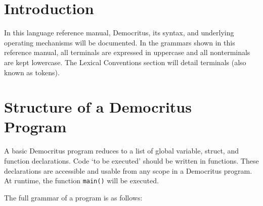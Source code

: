 \section{Introduction}
    In this language reference manual, Democritus, its syntax, and underlying operating mechanisms will be documented. In the grammars shown in this reference manual, all terminals are expressed in uppercase and all nonterminals are kept lowercase. The Lexical Conventions section will detail terminals (also known as tokens). 

\section{Structure of a Democritus Program}
    A basic Democritus program reduces to a list of global variable, struct, and function declarations. Code `to be executed' should be written in functions. These declarations are accessible and usable from any scope in a Democritus program. At runtime, the function \texttt{main()} will be executed.

    \bigskip \noindent
    The full grammar of a program is as follows:

